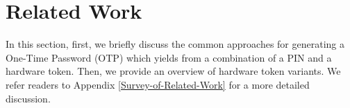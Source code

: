 
\vspace{-3mm}
\section{Related Work}

\vspace{-2mm}



%
%
%


In this section, first, we briefly discuss the common approaches for generating a One-Time Password (OTP) which yields from a combination of a PIN and a hardware token.  Then, we provide an overview of hardware token variants. We refer readers to Appendix \ref{Survey-of-Related-Work} for a more detailed discussion. 

